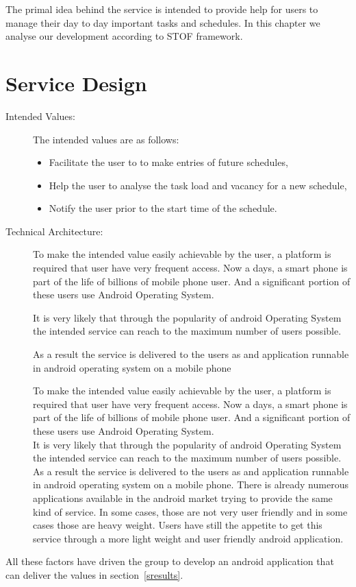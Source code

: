 \documentclass[10pt,a4paper]{report}
\begin{document}
The primal idea behind the service is intended to provide help for users to manage their day to day important tasks and schedules. In this chapter we analyse our development according to STOF framework.

\section{Service Design}

\begin{description}
 \item[Intended Values:] The intended values are as follows:
   \begin{itemize}
   		\item Facilitate the user to to make entries of future schedules,
   		\item Help the user to analyse the task load and vacancy for a new schedule,
   		\item Notify the user prior to the start time of the schedule.
   \end{itemize}    
 \item[Technical Architecture:] To make the intended value easily achievable by the user, a platform is required that user have very frequent access. Now a days, a smart phone is part of the life of billions of mobile phone user. And a significant portion of these users use Android Operating System.
 
It is very likely that through the popularity of android Operating System the intended service can reach to the maximum number of users possible.

As a result the service is delivered to the users as and application runnable in android operating system on a mobile phone

To make the intended value easily achievable by the user, a platform is required that user have very frequent access. Now a days, a smart phone is part of the life of billions of mobile phone user. And a significant portion of these users use Android Operating System. \\

It is very likely that through the popularity of android Operating System the intended service can reach to the maximum number of users possible. As a result the service is delivered to the users as and application runnable in android operating system on a mobile phone. There is already numerous applications available in the android market trying to provide the same kind of service. In some cases, those are not very user friendly and in some cases those are heavy weight. Users have still the appetite to get this service through a more light weight and user friendly android application.
\end{description}
All these factors have driven the group to develop an android application that can deliver the values in section~\ref{sresults}.
\end{document}
